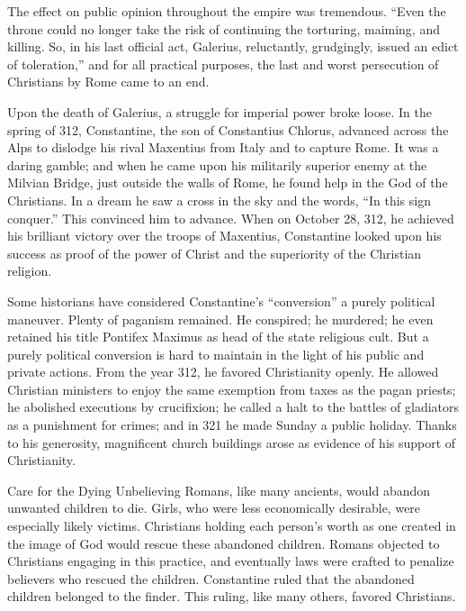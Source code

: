 The effect on public opinion throughout the empire was tremendous. “Even the throne could no longer
take the risk of continuing the torturing, maiming, and killing. So, in his last official act,
Galerius, reluctantly, grudgingly, issued an edict of toleration,” and for all practical purposes,
the last and worst persecution of Christians by Rome came to an end.

Upon the death of Galerius, a struggle for imperial power broke loose. In the spring of 312,
Constantine, the son of Constantius Chlorus, advanced across the Alps to dislodge his rival
Maxentius from Italy and to capture Rome. It was a daring gamble; and when he came upon his
militarily superior enemy at the Milvian Bridge, just outside the walls of Rome, he found help in
the God of the Christians. In a dream he saw a cross in the sky and the words, “In this sign
conquer.” This convinced him to advance. When on October 28, 312, he achieved his brilliant victory
over the troops of Maxentius, Constantine looked upon his success as proof of the power of Christ
and the superiority of the Christian religion.

Some historians have considered Constantine’s “conversion” a purely political maneuver. Plenty of
paganism remained. He conspired; he murdered; he even retained his title Pontifex Maximus as head of
the state religious cult. But a purely political conversion is hard to maintain in the light of his
public and private actions. From the year 312, he favored Christianity openly. He allowed Christian
ministers to enjoy the same exemption from taxes as the pagan priests; he abolished executions by
crucifixion; he called a halt to the battles of gladiators as a punishment for crimes; and in 321 he
made Sunday a public holiday. Thanks to his generosity, magnificent church buildings arose as
evidence of his support of Christianity.

\begin{sidebar}{Care for the Dying}
Unbelieving Romans, like many ancients, would abandon unwanted children to die. Girls, who were less
economically desirable, were especially likely victims. Christians holding each person’s worth as
one created in the image of God would rescue these abandoned children. Romans objected to Christians
engaging in this practice, and eventually laws were crafted to penalize believers who rescued the
children. Constantine ruled that the abandoned children belonged to the finder. This ruling, like
many others, favored Christians.
\end{sidebar}

